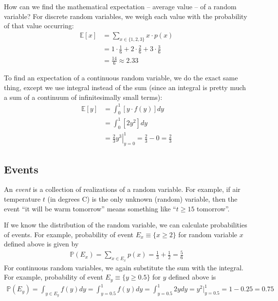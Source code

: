 \documentclass{article}
\begin{document}
How can we find the mathematical expectation -- average value -- of a random variable? For discrete random variables, we weigh each value with the probability of that value occurring:
\begin{align*}
	\mathbb{E}[x] &= \sum_{x \in \{1,2,3\}} x \cdot p(x)
	\\
	&= 1 \cdot \frac{1}{6} + 2 \cdot \frac{2}{6} + 3 \cdot \frac{3}{6}
	\\
	&= \frac{14}{6} \approx 2.33
\end{align*}

To find an expectation of a continuous random variable, we do the exact same thing, except we use integral instead of the sum (since an integral is pretty much a sum of a continuum of infinitesimally small terms):
\begin{align*}
	\mathbb{E}[y] &= \int_0^1 \left[y \cdot f(y)\right] dy
	\\
	&= \int_0^1 \left[2y^2 \right] dy
	\\
	&= \left. \frac{2}{3} y^3 \right|_{y=0}^{1} = \frac{2}{3} - 0 = \frac{2}{3}
\end{align*}


\subsection{Events}

An \emph{event} is a collection of realizations of a random variable. For example, if air temperature $t$ (in degrees C) is the only unknown (random) variable, then the event ``it will be warm tomorrow'' means something like ``$t \geq 15$ tomorrow''.

If we know the distribution of the random variable, we can calculate probabilities of events. For example, probability of event $E_x \equiv \{x \geq 2\}$ for random variable $x$ defined above is given by
\begin{align*}
	\mathbb{P}(E_x) = \sum_{x \in E_x} p(x) = \frac{1}{3} + \frac{1}{2} = \frac{5}{6}
\end{align*}
For continuous random variables, we again substitute the sum with the integral. For example, probability of event $E_y \equiv \{y \geq 0.5\}$ for $y$ defined above is
\begin{align*}
	\mathbb{P}(E_y) = \int_{y \in E_y} f(y) dy = \int_{y=0.5}^1 f(y) dy  = \int_{y=0.5}^1 2y dy = y^2 |_{y=0.5}^1 = 1 - 0.25 = 0.75
\end{align*}
\end{document}
